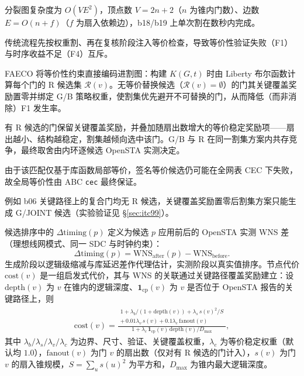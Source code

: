 \documentclass[journal]{IEEEtran}
\begin{document}
分裂图复杂度为 $O(VE^2)$，顶点数 $V=2n+2$（$n$ 为锥内门数）、边数 $E=O(n+f)$（$f$ 为扇入依赖边），b18/b19 上单次割在数秒内完成。

传统流程先按权重割、再在复核阶段注入等价检查，导致等价性验证失败（F1）与时序收益不足（F4）互斥。

FAECO 将等价性约束直接编码进割图：构建 $K(G, t)$ 时由 Liberty 布尔函数计算每个门的 R 候选集 $\mathcal{R}(v)$。无等价替换候选（$\mathcal{R}(v)=\emptyset$）的门其关键覆盖奖励置零并绑定 G/B 策略权重，使割集优先避开不可替换的门，从而降低（而非消除）F1 发生率。

有 R 候选的门保留关键覆盖奖励，并叠加随扇出数增大的等价稳定奖励项——扇出越小、结构越稳定，割集越倾向选中该门。G/B 与 R 在同一割集方案内共存竞争，最终取舍由内环逐候选 OpenSTA 实测决定。

由于该匹配仅基于库函数局部等价，签名等价候选仍可能在全网表 CEC 下失败，故全局等价性由 ABC \texttt{cec} 最终保证。

例如 b06 关键路径上的复合门均无 R 候选，关键覆盖奖励置零后割集方案只能生成 G/JOINT 候选（实验验证见 \S\ref{sec:itc99}）。

候选排序中的 $\Delta\mathrm{timing}(p)$ 定义为候选 $p$ 应用前后的 OpenSTA 实测 WNS 差（理想线网模式、同一 SDC 与时钟约束）：
\begin{equation}\label{eq:dtiming}
\Delta\mathrm{timing}(p) = \mathrm{WNS}_{\mathrm{after}}(p) - \mathrm{WNS}_{\mathrm{before}}.
\end{equation}
生成阶段以逻辑级缩减与库延迟差作代理估计，实测阶段以真实值排序。节点代价 $\mathrm{cost}(v)$ 是一组启发式代价，其与 WNS 的关联通过关键路径覆盖奖励建立：设 $\mathrm{depth}(v)$ 为 $v$ 在锥内的逻辑深度、$\mathbf{1}_{\mathrm{cp}}(v)$ 为 $v$ 是否位于 OpenSTA 报告的关键路径上，则
{\small
\begin{equation}
\label{eq:cost}
\begin{split}
\mathrm{cost}(v) = \frac{\substack{1 + \lambda_b/(1+\mathrm{depth}(v)) + \lambda_s\,s(v)^2/S \\ +\, 0.01\lambda_v\,s(v) + 0.1\lambda_e\,\mathrm{fanout}(v)}}{1 + \lambda_c\,\mathbf{1}_{\mathrm{cp}}(v)\,\mathrm{depth}(v)/D_{\max}},
\end{split}
\end{equation}
}
其中 $\lambda_b/\lambda_s/\lambda_v/\lambda_c$ 为边界、尺寸、验证、关键覆盖权重，$\lambda_e$ 为等价稳定权重（默认均 $1.0$），$\mathrm{fanout}(v)$ 为门 $v$ 的扇出数（仅对有 R 候选的门计入），$s(v)$ 为门 $v$ 的扇入锥规模，$S=\sum_u s(u)^2$ 为平方和，$D_{\max}$ 为锥内最大逻辑深度。
\end{document}
